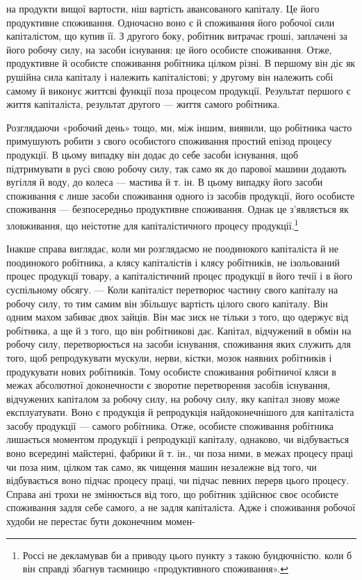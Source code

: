\parcont{}  %
на продукти вищої вартости, ніш вартість авансованого капіталу.
Це його продуктивне споживання. Одночасно воно є й
споживання його робочої сили капіталістом, що купив її. З другого
боку, робітник витрачає гроші, заплачені за його робочу
силу, на засоби існування: це його особисте споживання. Отже,
продуктивне й особисте споживання робітника цілком різні.
В першому він діє як рушійна сила капіталу і належить капіталістові;
у другому він належить собі самому й виконує життєві
функції поза процесом продукції. Результат першого є життя
капіталіста, результат другого — життя самого робітника.

Розглядаючи «робочий день» тощо, ми, між іншим, виявили,
що робітника часто примушують робити з свого особистого споживання
простий епізод процесу продукції. В цьому випадку
він додає до себе засоби існування, щоб підтримувати в русі
свою робочу силу, так само як до парової машини додають вугілля
й воду, до колеса — мастива й т. ін. В цьому випадку його засоби
споживання є лише засоби споживання одного із засобів продукції,
його особисте споживання — безпосередньо продуктивне
споживання. Однак це з’являється як зловживання, що неістотне
для капіталістичного процесу продукції.\footnote{
Россі не декламував би а приводу цього пункту з такою бундючністю.
коли б він справді збагнув таємницю «продуктивного споживання».
}

Інакше справа виглядає, коли ми розглядаємо не поодинокого
капіталіста й не поодинокого робітника, а клясу капіталістів
і клясу робітників, не ізольований процес продукції товару, а
капіталістичний процес продукції в його течії і в його суспільному
обсягу. — Коли капіталіст перетворює частину свого капіталу
на робочу силу, то тим самим він збільшує вартість цілого
свого капіталу. Він одним махом забиває двох зайців. Він має
зиск не тільки з того, що одержує від робітника, а ще й з того,
що він робітникові дає. Капітал, відчужений в обмін на робочу
силу, перетворюється на засоби існування, споживання яких
служить для того, щоб репродукувати мускули, нерви, кістки,
мозок наявних робітників і продукувати нових робітників. Тому
особисте споживання робітничої кляси в межах абсолютної
доконечности є зворотне перетворення засобів існування, відчужених
капіталом за робочу силу, на робочу силу, яку капітал
знову може експлуатувати. Воно є продукція й репродукція
найдоконечнішого для капіталіста засобу продукції — самого
робітника. Отже, особисте споживання робітника лишається
моментом продукції і репродукції капіталу, однаково, чи відбувається
воно всередині майстерні, фабрики й т. ін., чи поза ними,
в межах процесу праці чи поза ним, цілком так само, як чищення
машин незалежне від того, чи відбувається воно підчас процесу
праці, чи підчас певних перерв цього процесу. Справа ані
трохи не змінюється від того, що робітник здійснює своє особисте
споживання задля себе самого, а не задля капіталіста. Адже і
споживання робочої худоби не перестає бути доконечним момен-
\parbreak{}  %
